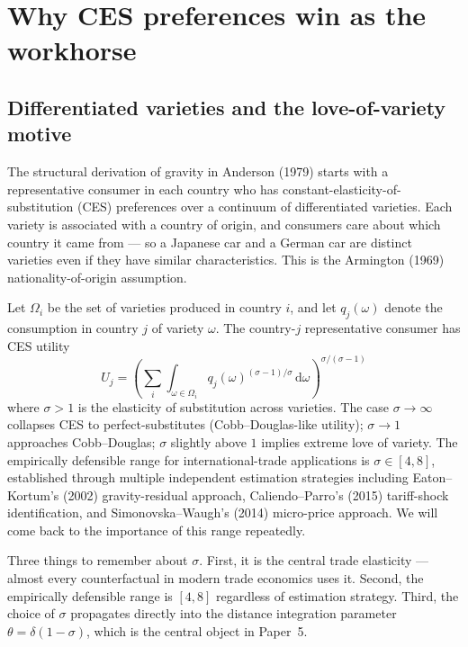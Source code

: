 \documentclass[11pt,letterpaper,oneside]{book}
\theoremstyle{definition}
\theoremstyle{remark}
\newcommand{\diff}{\mathrm{d}}
\begin{document}
\chapter{Why CES preferences win as the workhorse}

\section{Differentiated varieties and the love-of-variety motive}

The structural derivation of gravity in Anderson (1979) starts with a representative consumer in each country who has constant-elasticity-of-substitution (CES) preferences over a continuum of differentiated varieties. Each variety is associated with a country of origin, and consumers care about which country it came from --- so a Japanese car and a German car are distinct varieties even if they have similar characteristics. This is the Armington (1969) nationality-of-origin assumption.

Let $\Omega_i$ be the set of varieties produced in country $i$, and let $q_j(\omega)$ denote the consumption in country $j$ of variety $\omega$. The country-$j$ representative consumer has CES utility
\begin{equation}
U_j = \left( \sum_i \int_{\omega \in \Omega_i} q_j(\omega)^{(\sigma-1)/\sigma} \, \diff \omega \right)^{\sigma/(\sigma-1)}
\label{eq:ces-utility}
\end{equation}
where $\sigma > 1$ is the elasticity of substitution across varieties. The case $\sigma \to \infty$ collapses CES to perfect-substitutes (Cobb--Douglas-like utility); $\sigma \to 1$ approaches Cobb--Douglas; $\sigma$ slightly above $1$ implies extreme love of variety. The empirically defensible range for international-trade applications is $\sigma \in [4, 8]$, established through multiple independent estimation strategies including Eaton--Kortum's (2002) gravity-residual approach, Caliendo--Parro's (2015) tariff-shock identification, and Simonovska--Waugh's (2014) micro-price approach. We will come back to the importance of this range repeatedly.

\begin{tcolorbox}[insight]
Three things to remember about $\sigma$. First, it is the central trade elasticity --- almost every counterfactual in modern trade economics uses it. Second, the empirically defensible range is $[4, 8]$ regardless of estimation strategy. Third, the choice of $\sigma$ propagates directly into the distance integration parameter $\theta = \delta(1-\sigma)$, which is the central object in Paper~5.
\end{tcolorbox}
\end{document}
